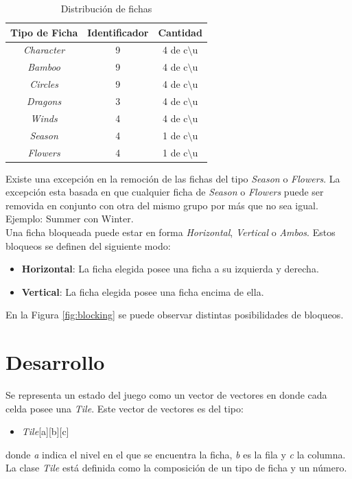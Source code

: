 \documentclass{sig-alternate}
\begin{document}
\begin{table}[h]
\begin{center}
	\begin{tabular}{|c|c|c|}
	\hline
	 Tipo de Ficha & Identificador & Cantidad\\
	\hline \hline
	\textit{Character} & 9 & 4 de c$\setminus$u \\
	\textit{Bamboo} & 9 & 4 de  c$\setminus$u  \\
	\textit{Circles} & 9 & 4 de  c$\setminus$u  \\
	\textit{Dragons} & 3 & 4 de  c$\setminus$u  \\	
	\textit{Winds} & 4 & 4 de  c$\setminus$u  \\
	\textit{Season} & 4 & 1 de c$\setminus$u \\
	\textit{Flowers} & 4 & 1 de  c$\setminus$u  \\
	\hline
	\end{tabular}
\end{center}
\caption{Distribuci\'on de fichas}
\label{tab:tiles}
\end{table}

	Existe una excepci\'on en la remoci\'on de las fichas del tipo \textit{Season} o \textit{Flowers}. La excepci\'on esta basada en que cualquier ficha de \textit{Season} o \textit{Flowers} puede ser removida en conjunto con otra del mismo grupo por más que no sea igual. Ejemplo: Summer con Winter. \\
	Una ficha bloqueada puede estar en forma \textit{Horizontal}, \textit{Vertical} o \textit{Ambos}. Estos bloqueos se definen del siguiente modo:
	\begin{itemize}
		\item \textbf{Horizontal}: La ficha elegida posee una ficha a su izquierda y derecha.
		\item \textbf{Vertical}: La ficha elegida posee una ficha encima de ella.		
	\end{itemize}
	En la Figura \ref{fig:blocking} se puede observar distintas posibilidades de bloqueos.
\section*{Desarrollo}

	Se representa un estado del juego como un vector de vectores en donde cada celda posee una \textit{Tile}. Este vector de vectores es del tipo:
	\begin{itemize}
		\item \textit{Tile}[a][b][c]
	\end{itemize}
	donde \textit{a} indica el nivel en el que se encuentra la ficha, \textit{b} es la fila y \textit{c} la columna. La clase \textit{Tile} est\'a definida como la composici\'on de un tipo de ficha y un n\'umero.
	
\end{document}
